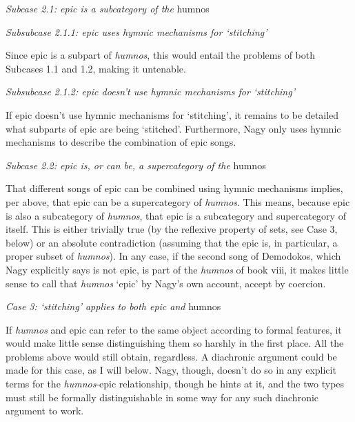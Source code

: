\documentclass[12pt]{article}
\begin{document}
\noindent \hfill \par
\noindent \textit{Subcase 2.1: epic is a subcategory of the} humnos

\noindent \hfill \par
\noindent \textit{Subsubcase 2.1.1: epic uses hymnic mechanisms for `stitching'}

Since epic is a subpart of \textit{humnos}, this would entail the problems of both Subcases 1.1 and 1.2, making it untenable.

\noindent \hfill \par
\noindent \textit{Subsubcase 2.1.2: epic doesn't use hymnic mechanisms for `stitching'}

If epic doesn't use hymnic mechanisms for `stitching', it remains to be detailed what subparts of epic are being `stitched'. Furthermore, Nagy only uses hymnic mechanisms to describe the combination of epic songs. 

\noindent \hfill \par
\noindent \textit{Subcase 2.2: epic is, or can be, a supercategory of the} humnos

That different songs of epic can be combined using hymnic mechanisms implies, per above, that epic can be a supercategory of \textit{humnos}. This means, because epic is also a subcategory of \textit{humnos}, that epic is a subcategory and supercategory of itself. This is either trivially true (by the reflexive property of sets, see Case 3, below) or an absolute contradiction (assuming that the epic is, in particular, a proper subset of \textit{humnos}). In any case, if the second song of Demodokos, which Nagy explicitly says is not epic, is part of the \textit{humnos} of book viii, it makes little sense to call that \textit{humnos} `epic' by Nagy's own account, accept by coercion.

\noindent \hfill \par
\noindent \textit{Case 3: `stitching' applies to both epic and} humnos

If \textit{humnos} and epic can refer to the same object according to formal features, it would make little sense distinguishing them so harshly in the first place. All the problems above would still obtain, regardless. A diachronic argument could be made for this case, as I will below. Nagy, though, doesn't do so in any explicit terms for the \textit{humnos}-epic relationship, though he hints at it, and the two types must still be formally distinguishable in some way for any such diachronic argument to work.
\end{document}
